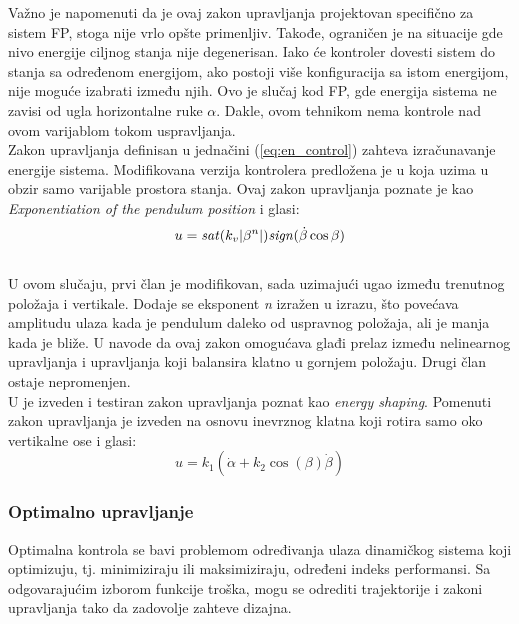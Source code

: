 \documentclass[a4paper,11pt]{article}
\theoremstyle{definition} \newtheorem{deff}{Definicija}[section]
\theoremstyle{definition} \newtheorem{prim}[deff]{Primer}
\theoremstyle{plain} \newtheorem{teor}[deff]{Teorema}
\begin{document}
	Važno je napomenuti da je ovaj zakon upravljanja projektovan specifično za sistem FP, stoga nije vrlo opšte primenljiv. Takođe, ograničen je na situacije gde nivo energije ciljnog stanja nije degenerisan. Iako će kontroler dovesti sistem do stanja sa određenom energijom, ako postoji više konfiguracija sa istom energijom, nije moguće izabrati između njih. Ovo je slučaj kod FP, gde energija sistema ne zavisi od ugla horizontalne ruke $\alpha$. Dakle, ovom tehnikom nema kontrole nad ovom varijablom tokom uspravljanja. \\
	
	Zakon upravljanja definisan u jednačini (\ref{eq:en_control}) zahteva izračunavanje energije sistema. Modifikovana verzija kontrolera predložena je u \cite{energy_c} koja uzima u obzir samo varijable prostora stanja. Ovaj zakon upravljanja poznate je kao 
	\textit{Exponentiation of the pendulum position} i glasi:\\
	
	\begin{equation}
		u = \text{\textit{sat}}(k_v |\beta^n|) \text{\textit{sign}}( \dot{\beta} \cos \beta)
	\end{equation} \\
	
	U ovom slučaju, prvi član je modifikovan, sada uzimajući ugao između trenutnog položaja i vertikale.
	Dodaje se eksponent \textit{n} izražen u izrazu, što povećava amplitudu ulaza kada je pendulum daleko od uspravnog položaja, ali je manja kada je bliže. U \cite{inicijalna} navode da ovaj zakon omogućava glađi prelaz između nelinearnog upravljanja i upravljanja koji balansira klatno u gornjem položaju. Drugi član ostaje nepromenjen. \\
	
	U \cite{ener_shaping} je izveden i testiran zakon upravljanja poznat kao \textit{energy shaping}. Pomenuti zakon upravljanja je izveden na osnovu inevrznog klatna koji rotira samo oko vertikalne ose i glasi: \\
	
	\begin{equation}
		u = k_1 (\dot\alpha + k_2 \cos(\beta) \dot\beta)	
	\end{equation}
	
	\subsubsection{Optimalno upravljanje}
	Optimalna kontrola se bavi problemom određivanja ulaza dinamičkog sistema koji optimizuju, tj. minimiziraju ili maksimiziraju, određeni indeks performansi. Sa odgovarajućim izborom funkcije troška, mogu se odrediti trajektorije i zakoni upravljanja tako da zadovolje zahteve dizajna.
	
\end{document}
